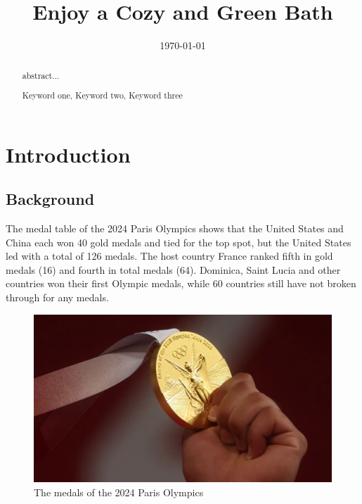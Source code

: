 \documentclass{mcmthesis}
\title{Enjoy a Cozy and Green Bath}
\date{\today}
\begin{document}
\begin{abstract}

abstract...

\begin{keywords}
	Keyword one, Keyword two, Keyword three
\end{keywords}

\end{abstract}


\maketitle
\tableofcontents        %
\thispagestyle{empty}
\newpage







\section{Introduction}

\subsection{Background}
The medal table of the 2024 Paris Olympics shows that the United States and China each won 40 gold medals and tied for the top spot, but the United States led with a total of 126 medals. The host country France ranked fifth in gold medals (16) and fourth in total medals (64). Dominica, Saint Lucia and other countries won their first Olympic medals, while 60 countries still have not broken through for any medals.
\begin{figure}[htbp]
	\centering
	\includegraphics[width=0.7\linewidth]{fig/background}
	\caption{The medals of the 2024 Paris Olympics}
\end{figure}
\end{document}
